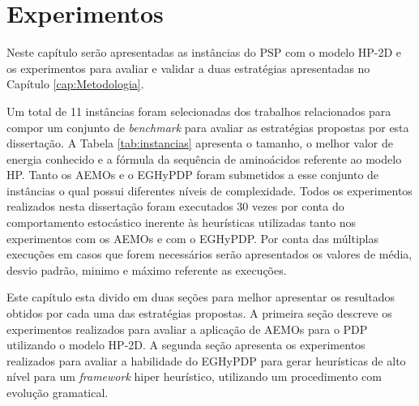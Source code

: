 \chapter{Experimentos}

Neste capítulo serão apresentadas as instâncias do PSP com o modelo HP-2D e os experimentos para avaliar e validar a duas estratégias apresentadas no Capítulo \ref{cap:Metodologia}.

Um  total de 11 instâncias foram selecionadas  dos trabalhos relacionados para compor um conjunto de \textit{benchmark} para avaliar as estratégias propostas por esta dissertação. A Tabela \ref{tab:instancias} apresenta o tamanho, o melhor valor de energia conhecido e a fórmula da sequência de aminoácidos referente ao modelo HP. Tanto os AEMOs e o EGHyPDP foram submetidos a esse conjunto de instâncias o qual possui diferentes níveis de complexidade. Todos os experimentos realizados nesta dissertação foram executados 30 vezes por conta do comportamento estocástico inerente às heurísticas utilizadas tanto nos experimentos com os AEMOs e com o EGHyPDP. Por conta das múltiplas execuções em casos que forem necessários serão apresentados os valores de média, desvio padrão, minimo e máximo referente as execuções.



Este capítulo esta divido em duas seções para melhor apresentar os resultados obtidos por cada uma das estratégias propostas. A primeira seção descreve os experimentos realizados para avaliar a aplicação de AEMOs para o PDP utilizando o modelo HP-2D. A segunda seção apresenta os experimentos realizados para avaliar a habilidade do EGHyPDP para gerar heurísticas de alto nível para um \textit{framework} hiper heurístico, utilizando um procedimento com evolução gramatical.



